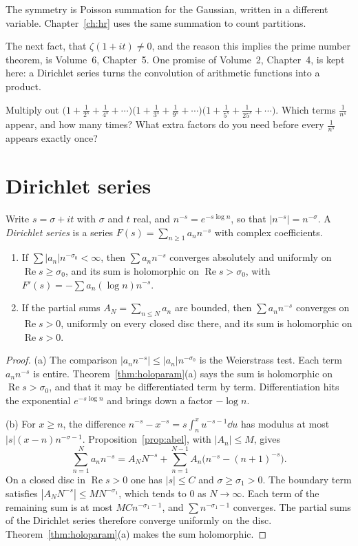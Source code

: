 The symmetry is Poisson summation for the Gaussian, written in a different variable. Chapter~\ref{ch:hr} uses the same summation to count partitions.

The next fact, that $\zeta(1+it)\ne0$, and the reason this implies the prime number theorem, is Volume~6, Chapter~5. One promise of Volume~2, Chapter~4, is kept here: a Dirichlet series turns the convolution of arithmetic functions into a product.

\begin{think}
Multiply out $\bigl(1+\frac1{2^s}+\frac1{4^s}+\cdots\bigr)\bigl(1+\frac1{3^s}+\frac1{9^s}+\cdots\bigr)\bigl(1+\frac1{5^s}+\frac1{25^s}+\cdots\bigr)$. Which terms $\frac1{n^s}$ appear, and how many times? What extra factors do you need before every $\frac1{n^s}$ appears exactly once?
\end{think}

\section{Dirichlet series}

Write $s=\sigma+it$ with $\sigma$ and $t$ real, and $n^{-s}=e^{-s\log n}$, so that $|n^{-s}|=n^{-\sigma}$. A \emph{Dirichlet series} is a series $F(s)=\sum_{n\ge1}a_nn^{-s}$ with complex coefficients.

\begin{proposition}\label{prop:dirseries}
\begin{enumerate}[label=(\alph*)]
\item If $\sum|a_n|n^{-\sigma_0}<\infty$, then $\sum a_nn^{-s}$ converges absolutely and uniformly on $\operatorname{Re}s\ge\sigma_0$, and its sum is holomorphic on
$\operatorname{Re}s>\sigma_0$, with $F'(s)=-\sum a_n(\log n)n^{-s}$.
\item If the partial sums $A_N=\sum_{n\le N}a_n$ are bounded, then $\sum a_nn^{-s}$ converges on $\operatorname{Re}s>0$, uniformly on every closed disc there,
and its sum is holomorphic on $\operatorname{Re}s>0$.
\end{enumerate}
\end{proposition}
\begin{proof}
(a) The comparison $|a_nn^{-s}|\le|a_n|n^{-\sigma_0}$ is the Weierstrass test. Each term $a_nn^{-s}$ is entire. Theorem~\ref{thm:holoparam}(a) says the sum is holomorphic on $\operatorname{Re}s>\sigma_0$, and that it may be differentiated term by term. Differentiation hits the exponential $e^{-s\log n}$ and brings down a factor $-\log n$.

(b) For $x\ge n$, the difference $n^{-s}-x^{-s}=s\int_n^xu^{-s-1}\dd u$ has modulus at most $|s|(x-n)n^{-\sigma-1}$. Proposition~\ref{prop:abel}, with $|A_n|\le M$, gives
\[
\sum_{n=1}^Na_nn^{-s}=A_NN^{-s}+\sum_{n=1}^{N-1}A_n\bigl(n^{-s}-(n+1)^{-s}\bigr).
\]
On a closed disc in $\operatorname{Re}s>0$ one has $|s|\le C$ and $\sigma\ge\sigma_1>0$. The boundary term satisfies $|A_NN^{-s}|\le MN^{-\sigma_1}$, which tends to $0$ as $N\to\infty$. Each term of the remaining sum is at most $MCn^{-\sigma_1-1}$, and $\sum n^{-\sigma_1-1}$ converges. The partial sums of the Dirichlet series therefore converge uniformly on the disc. Theorem~\ref{thm:holoparam}(a) makes the sum holomorphic.
\end{proof}

